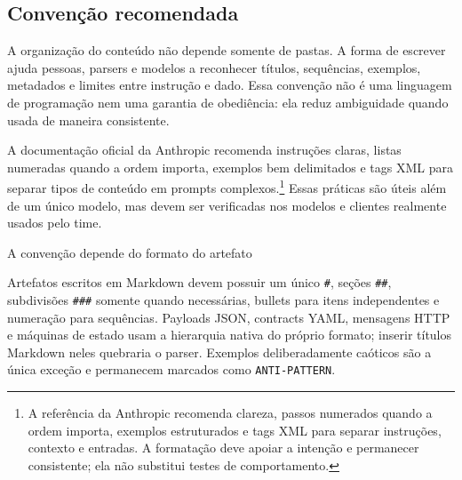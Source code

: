 \documentclass[
  10pt,
  a4paper,
  oneside]{book}
\begin{document}
\hypertarget{convenuxe7uxe3o-recomendada}{%
\subsection{Convenção recomendada}\label{convenuxe7uxe3o-recomendada}}

A organização do conteúdo não depende somente de pastas. A forma de
escrever ajuda pessoas, parsers e modelos a reconhecer títulos,
sequências, exemplos, metadados e limites entre instrução e dado. Essa
convenção não é uma linguagem de programação nem uma garantia de
obediência: ela reduz ambiguidade quando usada de maneira consistente.

A documentação oficial da Anthropic recomenda instruções claras, listas
numeradas quando a ordem importa, exemplos bem delimitados e tags XML
para separar tipos de conteúdo em prompts complexos.\footnote{A
  referência da Anthropic recomenda clareza, passos numerados quando a
  ordem importa, exemplos estruturados e tags XML para separar
  instruções, contexto e entradas. A formatação deve apoiar a intenção e
  permanecer consistente; ela não substitui testes de comportamento.}
Essas práticas são úteis além de um único modelo, mas devem ser
verificadas nos modelos e clientes realmente usados pelo time.

\begin{infobox}{A convenção depende do formato do artefato}

Artefatos escritos em Markdown devem possuir um único \texttt{\#},
seções \texttt{\#\#}, subdivisões \texttt{\#\#\#} somente quando
necessárias, bullets para itens independentes e numeração para
sequências. Payloads JSON, contracts YAML, mensagens HTTP e máquinas de
estado usam a hierarquia nativa do próprio formato; inserir títulos
Markdown neles quebraria o parser. Exemplos deliberadamente caóticos são
a única exceção e permanecem marcados como \texttt{ANTI-PATTERN}.

\end{infobox}
\end{document}
